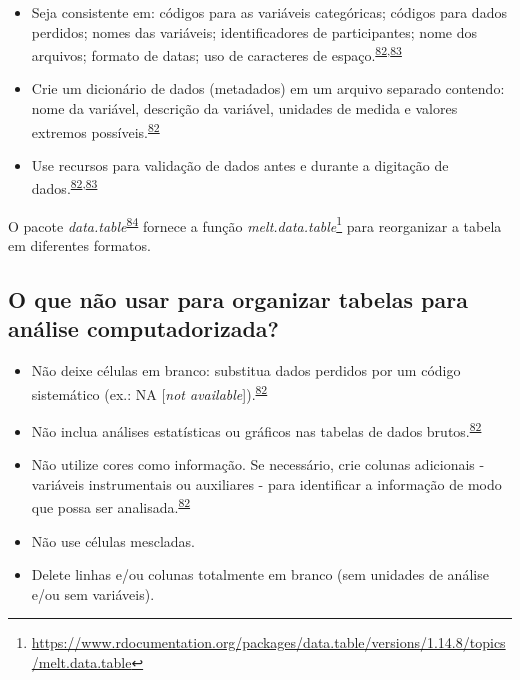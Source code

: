 \documentclass[
  a4paper,
]{book}
\renewcommand{\href}[2]{#2\footnote{\url{#1}}}
\newenvironment{infobox}[1]
  {
  \begin{itemize}
  \renewcommand{\labelitemi}{
    \raisebox{-.7\height}[0pt][0pt]{
      {\setkeys{Gin}{width=3em,keepaspectratio}
        \texttt{[image: \#1]}}
    }
  }
  \setlength{\fboxsep}{1em}
  \begin{blackbox}
  \item
  }
  {
  \end{blackbox}
  \end{itemize}
  }
\begin{document}
\begin{itemize}
\item
  Seja consistente em: códigos para as variáveis categóricas; códigos para dados perdidos; nomes das variáveis; identificadores de participantes; nome dos arquivos; formato de datas; uso de caracteres de espaço.\textsuperscript{\protect\hyperlink{ref-broman2018}{82},\protect\hyperlink{ref-Juluru2015}{83}}
\item
  Crie um dicionário de dados (metadados) em um arquivo separado contendo: nome da variável, descrição da variável, unidades de medida e valores extremos possíveis.\textsuperscript{\protect\hyperlink{ref-broman2018}{82}}
\item
  Use recursos para validação de dados antes e durante a digitação de dados.\textsuperscript{\protect\hyperlink{ref-broman2018}{82},\protect\hyperlink{ref-Juluru2015}{83}}
\end{itemize}

\begin{infobox}{images/Rlogo}
O pacote \emph{data.table}\textsuperscript{\protect\hyperlink{ref-data.table}{84}} fornece a função \href{https://www.rdocumentation.org/packages/data.table/versions/1.14.8/topics/melt.data.table}{\emph{melt.data.table}} para reorganizar a tabela em diferentes formatos.

\end{infobox}

\hypertarget{o-que-nuxe3o-usar-para-organizar-tabelas-para-anuxe1lise-computadorizada}{%
\subsection{O que não usar para organizar tabelas para análise computadorizada?}\label{o-que-nuxe3o-usar-para-organizar-tabelas-para-anuxe1lise-computadorizada}}

\begin{itemize}
\item
  Não deixe células em branco: substitua dados perdidos por um código sistemático (ex.: NA {[}\emph{not available}{]}).\textsuperscript{\protect\hyperlink{ref-broman2018}{82}}
\item
  Não inclua análises estatísticas ou gráficos nas tabelas de dados brutos.\textsuperscript{\protect\hyperlink{ref-broman2018}{82}}
\item
  Não utilize cores como informação. Se necessário, crie colunas adicionais - variáveis instrumentais ou auxiliares - para identificar a informação de modo que possa ser analisada.\textsuperscript{\protect\hyperlink{ref-broman2018}{82}}
\item
  Não use células mescladas.
\item
  Delete linhas e/ou colunas totalmente em branco (sem unidades de análise e/ou sem variáveis).
\end{itemize}
\end{document}
